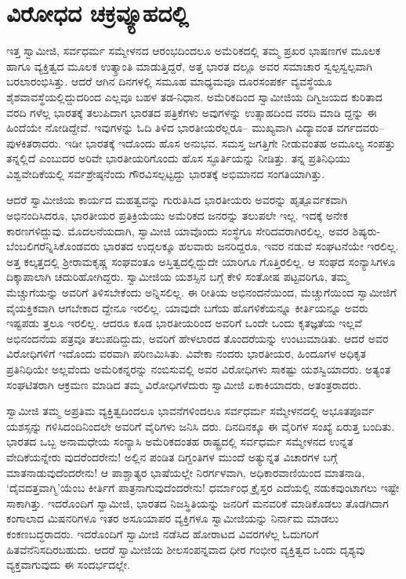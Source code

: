 
\chapter{ವಿರೋಧದ ಚಕ್ರವ್ಯೂಹದಲ್ಲಿ}

\noindent

ಇತ್ತ ಸ್ವಾಮೀಜಿ, ಸರ್ವಧರ್ಮ ಸಮ್ಮೇಳನದ ಆರಂಭದಿಂದಲೂ ಅಮೆರಿಕದಲ್ಲಿ ತಮ್ಮ ಪ್ರಖರ ಭಾಷಣಗಳ ಮೂಲಕ ಹಾಗೂ ವ್ಯಕ್ತಿತ್ವದ ಮೂಲಕ ಉತ್ಕ್ರಾಂತಿ ಮಾಡುತ್ತಿದ್ದರೆ, ಅತ್ತ ಭಾರತ ದಲ್ಲೂ ಅವರ ಸಮಾಚಾರ ಸ್ವಲ್ಪಸ್ವಲ್ಪವಾಗಿ ಬರಲಾರಂಭಿಸಿತ್ತು. ಆದರೆ ಆಗಿನ ದಿನಗಳಲ್ಲಿ ಸಮೂಹ ಮಾಧ್ಯಮವೂ ದೂರಸಂಪರ್ಕ ವ್ಯವಸ್ಥೆಯೂ ಶೈಶವಾವಸ್ಥೆಯಲ್ಲಿದ್ದುದರಿಂದ ಎಲ್ಲವೂ ಬಹಳ ತಡ-ನಿಧಾನ. ಅಮೆರಿಕದಿಂದ ಸ್ವಾಮೀಜಿಯ ದಿಗ್ವಿಜಯದ ಕುರಿತಾದ ವರದಿ ಗಳೆಲ್ಲ ಭಾರತಕ್ಕೆ ತಲುಪಿದಾಗ ಭಾರತದ ಪತ್ರಿಕೆಗಳು ಅವುಗಳನ್ನು ಉತ್ಸಾಹದಿಂದ ವರದಿ ಮಾಡಿ ದ್ದನ್ನು ಈ ಹಿಂದೆಯೇ ನೋಡಿದ್ದೇವೆ. ಇವುಗಳನ್ನು ಓದಿ ತಿಳಿದ ಭಾರತೀಯರೆಲ್ಲರೂ– ಮುಖ್ಯವಾಗಿ ವಿದ್ಯಾವಂತ ವರ್ಗದವರು–ಪುಳಕಿತರಾದರು. ಇಡೀ ಭಾರತಕ್ಕೆ ಇದೊಂದು ಹೊಸ ಅನುಭವ. ಸಮಸ್ತ ಜಗತ್ತಿಗೇ ನೀಡುವಂತಹ ಅಮೂಲ್ಯ ಸಂಪತ್ತು ತನ್ನಲ್ಲಿದೆ ಎಂಬುದರ ಅರಿವೇ ಭಾರತೀಯರಿಗೊಂದು ಹೊಸ ಸ್ಫೂರ್ತಿಯನ್ನು ನೀಡಿತ್ತು. ತನ್ನ ಪ್ರತಿನಿಧಿಯು ವಿಶ್ವವೇದಿಕೆಯಲ್ಲಿ ಸರ್ವಶ್ರೇಷ್ಠನೆಂದು ಗೌರವಿಸಲ್ಪಟ್ಟದ್ದು ಭಾರತಕ್ಕೆ ಅಭಿಮಾನದ ಸಂಗತಿಯಾಗಿತ್ತು.

ಆದರೆ ಸ್ವಾಮೀಜಿಯ ಕಾರ್ಯದ ಮಹತ್ವವನ್ನು ಗುರುತಿಸಿದ ಭಾರತೀಯರು ಅವರನ್ನು ಹೃತ್ಪೂರ್ವಕವಾಗಿ ಅಭಿನಂದಿಸಿದರೂ, ಭಾರತೀಯರ ಪ್ರತಿಕ್ರಿಯೆಯು ಅಮೆರಿಕದ ಜನರನ್ನು ತಲುಪಲೇ ಇಲ್ಲ. ಇದಕ್ಕೆ ಅನೇಕ ಕಾರಣಗಳಿದ್ದುವು. ಮೊದಲನೆಯದಾಗಿ, ಸ್ವಾಮೀಜಿ ಯಾವೊಂದು ಸಂಸ್ಥೆಗೂ ಸೇರಿದವರಾಗಿರಲಿಲ್ಲ. ಅವರ ಶಿಷ್ಯರು-ಬೆಂಬಲಿಗರೆನ್ನಿಸಿಕೊಂಡವರು ಭಾರತದ ಉದ್ಗಲಕ್ಕೂ ಹಲವಾರು ಜನರಿದ್ದರೂ, ಇವರ ನಡುವೆ ಸಂಘಟನೆಯೇ ಇರಲಿಲ್ಲ. ಅತ್ತ ಕಲ್ಕತ್ತದಲ್ಲಿ ಶ್ರೀರಾಮಕೃಷ್ಣ ಸಂಘವಂತೂ ಅಸ್ತಿತ್ವದಲ್ಲಿದ್ದುದೇ ಯಾರಿಗೂ ಗೊತ್ತಿರಲಿಲ್ಲ. ಆ ಸಂಘದ ಸಂನ್ಯಾಸಿಗಳೂ ದಿಕ್ಕಾಪಾಲಾಗಿ ಚದುರಿಹೋಗಿದ್ದರು. ಸ್ವಾಮೀಜಿಯ ಯಶಸ್ಸಿನ ಬಗ್ಗೆ ಕೇಳಿ ಸಂತೋಷ ಪಟ್ಟವರಿಗೂ, ತಮ್ಮ ಮೆಚ್ಚುಗೆಯನ್ನು ಅವರಿಗೆ ತಿಳಿಸಬೇಕೆಂದು ಅನ್ನಿಸಲಿಲ್ಲ. ಈ ರೀತಿಯ ಅಭಿನಂದನೆಯಿಂದ, ಮೆಚ್ಚುಗೆಯಿಂದ ಸ್ವಾಮೀಜಿಗೆ ವೈಯಕ್ತಿಕವಾಗಿ ಆಗಬೇಕಾದ ದ್ದೇನೂ ಇರಲಿಲ್ಲ. ಯಾವುದೇ ಬಗೆಯ ಹೊಗಳಿಕೆಯನ್ನೂ ಕೀರ್ತಿಯನ್ನೂ ಅವರು ಇಷ್ಟಪಡು ತ್ತಲೂ ಇರಲಿಲ್ಲ. ಆದರೂ ಕೂಡ ಭಾರತೀಯರಿಂದ ಅವರಿಗೆ ಒಂದೇ ಒಂದು ಕೃತಜ್ಞತೆಯ ಇಲ್ಲವೆ ಅಭಿನಂದನೆಯ ಪತ್ರವೂ ತಲುಪದಿದ್ದುದು, ಅವರಿಗೆ ಹೇಳಲಾರದ ತೊಂದರೆಯನ್ನು ಉಂಟುಮಾಡಿತು. ಆದರೆ ಅವರ ವಿರೋಧಿಗಳಿಗೆ ಇದೊಂದು ವರವಾಗಿ ಪರಿಣಮಿಸಿತು. ವಿವೇಕಾ ನಂದರು ಭಾರತೀಯರ, ಹಿಂದೂಗಳ ಅಧಿಕೃತ ಪ್ರತಿನಿಧಿಯೇ ಅಲ್ಲವೆಂದು ಅಮೆರಿಕನ್ನರನ್ನು ನಂಬಿಸುವಲ್ಲಿ ಅವರ ವಿರೋಧಿಗಳು ಸಾಕಷ್ಟು ಯಶಸ್ವಿಯಾದರು. ಅತ್ಯಂತ ಸಂಘಟಿತರಾಗಿ ಆಕ್ರಮಣ ಮಾಡಿದ ತಮ್ಮ ವಿರೋಧಿಗಳೆದುರು ಸ್ವಾಮೀಜಿ ಏಕಾಕಿಯಾದರು, ಅತಂತ್ರರಾದರು.

ಸ್ವಾಮೀಜಿ ತಮ್ಮ ಅಪ್ರತಿಮ ವ್ಯಕ್ತಿತ್ವದಿಂದಲೂ ಭಾವನೆಗಳಿಂದಲೂ ಸರ್ವಧರ್ಮ ಸಮ್ಮೇಳನದಲ್ಲಿ ಅಭೂತಪೂರ್ವ ಯಶಸ್ಸನ್ನು ಗಳಿಸಿದಂದಿನಿಂದಲೇ ಅವರಿಗೆ ವೈರಿಗಳು ಜನಿಸಿ ದರು. ದಿನದಿನಕ್ಕೂ ಈ ವೈರಿಗಳ ಸಂಖ್ಯೆ ಏರುತ್ತ ಬಂದಿತು. ಭಾರತದ ಒಬ್ಬ ಅನಾಮಧೇಯ ಸಂನ್ಯಾಸಿ ಅಮೆರಿಕದಂತಹ ರಾಷ್ಟ್ರದಲ್ಲಿ ಸರ್ವಧರ್ಮ ಸಮ್ಮೇಳನದ ಉನ್ನತ ವೇದಿಕೆಯನ್ನೇರು ವುದರೆಂದರೇನು! ಅಲ್ಲಿನ ಪಂಡಿತ ದಿಗ್ದಂತಿಗಳ ಮುಂದೆ ಅತ್ಯುನ್ನತ ವಿಚಾರಗಳ ಬಗ್ಗೆ ಮಾತನಾಡುವುದೆಂದರೇನು! ಆ ಪಾಶ್ಚಾತ್ಯರ ಭಾಷೆಯಲ್ಲೇ ನಿರರ್ಗಳವಾಗಿ, ಅಧಿಕಾರವಾಣಿಯಿಂದ ಮಾತನಾಡಿ, ‘ದೈವದತ್ತವಾಗ್ಮಿ’ಯೆಂಬ ಕೀರ್ತಿಗೆ ಪಾತ್ರನಾಗುವುದೆಂದರೇನು! ಧರ್ಮಾಂಧ ಕ್ರೈಸ್ತರ ಎದೆಯಲ್ಲಿ ನಡುಕವುಂಟಾಗಲು ಇಷ್ಟೇ ಸಾಕಾಗಿತ್ತು. ಇದರೊಂದಿಗೆ ಸ್ವಾಮೀಜಿ, ಭಾರತದ ನಿಜಸ್ಥಿತಿಯನ್ನು ಜನರಿಗೆ ಮನವರಿಕೆ ಮಾಡಿಕೊಡಲು ತೊಡಗಿದಾಗ ಕಂಗಾಲಾದ ಮಿಷನರಿಗಳೂ ಇತರ ಅಸೂಯಾಪರ ವ್ಯಕ್ತಿಗಳೂ ಸ್ವಾಮೀಜಿಯನ್ನು ನಿರ್ನಾಮ ಮಾಡಲು ಕಂಕಣಬದ್ಧರಾದರು. ಇದರೊಂದಿಗೆ ಸ್ವಾಮೀಜಿ ನಡೆಸಿದ ಹೋರಾಟದ ವಿವರಗಳೆಲ್ಲ ಓದುಗರಿಗೆ ಹಿತವೆನೆನಿಸದಿರಬಹುದು. ಆದರೆ ಸ್ವಾಮೀಜಿಯ ಶೀಲಸಂಪನ್ನವಾದ ಧೀರ ಗಂಭೀರ ವ್ಯಕ್ತಿತ್ವದ ಒಂದು ದೃಶ್ಯವು ವ್ಯಕ್ತವಾಗುವುದು ಈ ಸಂದರ್ಭದಲ್ಲೇ.

